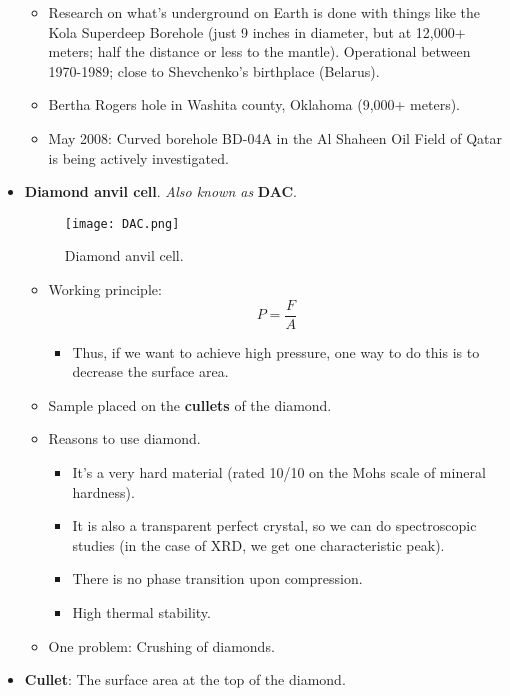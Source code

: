 \documentclass[../notes.tex]{subfiles}
\begin{document}
\begin{itemize}
\begin{itemize}
        \item Research on what's underground on Earth is done with things like the Kola Superdeep Borehole (just 9 inches in diameter, but at 12,000+ meters; half the distance or less to the mantle). Operational between 1970-1989; close to Shevchenko's birthplace (Belarus).
        \item Bertha Rogers hole in Washita county, Oklahoma (9,000+ meters).
        \item May 2008: Curved borehole BD-04A in the Al Shaheen Oil Field of Qatar is being actively investigated.
    \end{itemize}
    \item \textbf{Diamond anvil cell}. \emph{Also known as} \textbf{DAC}.
    \begin{figure}[h!]
        \centering
        \texttt{[image: DAC.png]}
        \caption{Diamond anvil cell.}
        \label{fig:DAC}
    \end{figure}
    \begin{itemize}
        \item Working principle:
        \begin{equation*}
            P = \frac{F}{A}
        \end{equation*}
        \begin{itemize}
            \item Thus, if we want to achieve high pressure, one way to do this is to decrease the surface area.
        \end{itemize}
        \item Sample placed on the \textbf{cullets} of the diamond.
        \item Reasons to use diamond.
        \begin{itemize}
            \item It's a very hard material (rated 10/10 on the Mohs scale of mineral hardness).
            \item It is also a transparent perfect crystal, so we can do spectroscopic studies (in the case of XRD, we get one characteristic peak).
            \item There is no phase transition upon compression.
            \item High thermal stability.
        \end{itemize}
        \item One problem: Crushing of diamonds.
    \end{itemize}
    \item \textbf{Cullet}: The surface area at the top of the diamond.

\end{itemize}
\end{document}
